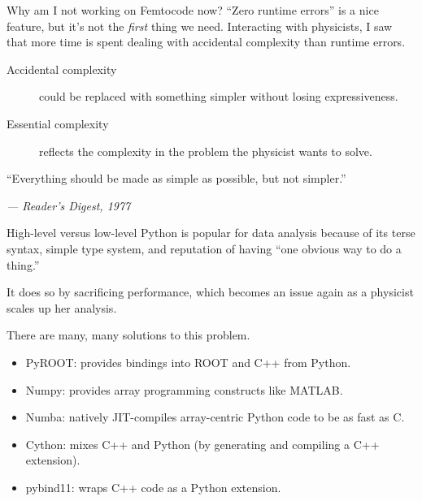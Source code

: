 \documentclass[aspectratio=169]{beamer}
\begin{document}
\begin{frame}{Why am I not working on Femtocode now?}
\large
\vspace{0.5 cm}
``Zero runtime errors'' is a nice feature, but it's not the {\it first} thing we need. Interacting with physicists, I saw that more time is spent dealing with accidental complexity than runtime errors.

\vspace{0.5 cm}
\begin{center}
\begin{minipage}{0.85\linewidth}
\begin{description}
\item[Accidental complexity] could be replaced with something simpler without losing expressiveness.

\item[Essential complexity] reflects the complexity in the problem the physicist wants to solve.
\end{description}
\end{minipage}
\end{center}

\vspace{1 cm}
``Everything should be made as simple as possible, but not simpler.''

\hfill \it --- Reader's Digest, 1977
\end{frame}

\begin{frame}{High-level versus low-level}
\vspace{0.5 cm}
Python is popular for data analysis because of its terse syntax, simple type system, and reputation of having ``one obvious way to do a thing.''

\vspace{0.5 cm}
It does so by sacrificing performance, which becomes an issue again as a physicist scales up her analysis.

\vspace{0.5 cm}
There are many, many solutions to this problem.

\begin{itemize}
\item PyROOT: provides bindings into ROOT and C++ from Python.
\item Numpy: provides array programming constructs like MATLAB.
\item Numba: natively JIT-compiles array-centric Python code to be as fast as C.
\item Cython: mixes C++ and Python (by generating and compiling a C++ extension).
\item pybind11: wraps C++ code as a Python extension.
\end{itemize}
\end{frame}
\end{document}

